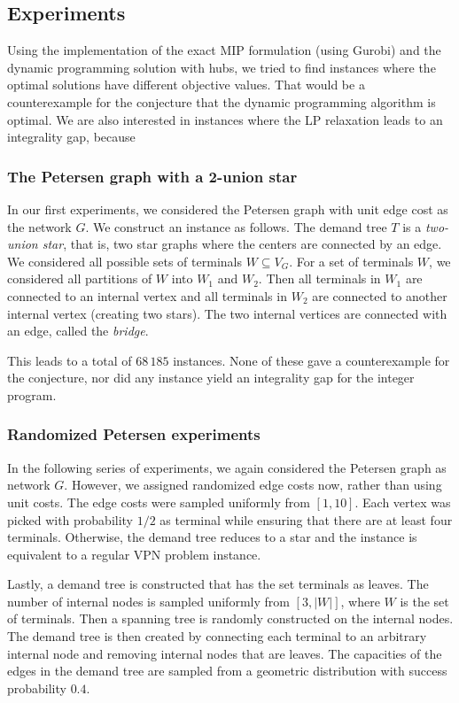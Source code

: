 \subsection{Experiments}
Using the implementation of the exact MIP formulation (using Gurobi) and the dynamic programming solution with hubs, we tried to find instances where the optimal solutions have different objective values.
That would be a counterexample for the conjecture that the dynamic programming algorithm is optimal.
We are also interested in instances where the LP relaxation leads to an integrality gap, because %

\subsubsection{The Petersen graph with a 2-union star}
In our first experiments, we considered the Petersen graph with unit edge cost as the network $G$.
We construct an instance as follows.
The demand tree $T$ is a \emph{two-union star}, that is, two star graphs where the centers are connected by an edge.
We considered all possible sets of terminals $W \subseteq V_G$.
For a set of terminals $W$, we considered all partitions of $W$ into $W_1$ and $W_2$.
Then all terminals in $W_1$ are connected to an internal vertex and all terminals in $W_2$ are connected to another internal vertex (creating two stars).
The two internal vertices are connected with an edge, called the \emph{bridge}.

This leads to a total of $68\,185$ instances.
None of these gave a counterexample for the conjecture, nor did any instance yield an integrality gap for the integer program.

\subsubsection{Randomized Petersen experiments}\label{subsubsec:random}
In the following series of experiments, we again considered the Petersen graph as network $G$.
However, we assigned randomized edge costs now, rather than using unit costs.
The edge costs were sampled uniformly from $[1, 10]$.
Each vertex was picked with probability $1/2$ as terminal while ensuring that there are at least four terminals.
Otherwise, the demand tree reduces to a star and the instance is equivalent to a regular VPN problem instance.

Lastly, a demand tree is constructed that has the set terminals as leaves.
The number of internal nodes is sampled uniformly from $[3, |W|]$, where $W$ is the set of terminals.
Then a spanning tree is randomly constructed on the internal nodes.
The demand tree is then created by connecting each terminal to an arbitrary internal node and removing internal nodes that are leaves.
The capacities of the edges in the demand tree are sampled from a geometric distribution with success probability $0.4$.

